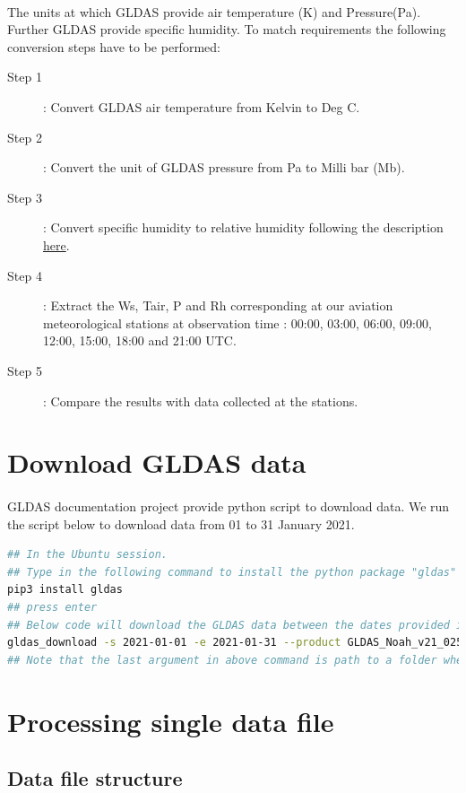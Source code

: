 \paragraph{}
The units at which GLDAS provide air temperature (K) and Pressure(Pa). Further GLDAS provide specific humidity. 
To match requirements the following conversion steps have to be performed:
\begin{description}
\item[Step 1] : Convert GLDAS air temperature from Kelvin to Deg C.
\item[Step 2] : Convert the unit of GLDAS pressure from Pa to Milli bar (Mb).
\item[Step 3] : Convert specific humidity to relative humidity following the description \href{https://earthscience.stackexchange.com/questions/2360/how-do-i-convert-specific-humidity-to-relative-humidity/}{here}.
\item[Step 4] : Extract the Ws, Tair, P and Rh corresponding at our aviation meteorological stations at observation time : 00:00, 03:00, 06:00, 09:00, 12:00, 15:00, 18:00 and 21:00 UTC.
\item[Step 5] : Compare the results with data collected at the stations.
\end{description}
\section{Download GLDAS data}
\paragraph{}
GLDAS documentation project provide python script to download data.
We run the script below to download data from 01 to 31 January 2021.
\begin{lstlisting}[language=Bash]
## In the Ubuntu session.
## Type in the following command to install the python package "gldas"
pip3 install gldas
## press enter
## Below code will download the GLDAS data between the dates provided in the command.
gldas_download -s 2021-01-01 -e 2021-01-31 --product GLDAS_Noah_v21_025 --username nina.younkap --password ****** /mnt/path/to/folder
## Note that the last argument in above command is path to a folder where the downloaded files will be stored.
\end{lstlisting}
\section{Processing single data file}
\subsection{ Data file structure}
